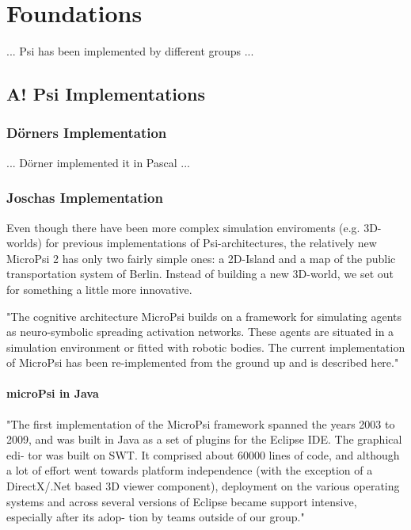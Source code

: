 \chapter{Foundations}

... Psi has been implemented by different groups ...

    \section{A! Psi Implementations}

        \subsection{Dörners Implementation}

... Dörner implemented it in Pascal ...

    \subsection{Joschas Implementation}
    
Even though there have been more complex simulation enviroments (e.g. 3D-worlds) for previous implementations of Psi-architectures, the relatively new MicroPsi 2 has only two fairly simple ones: a 2D-Island and a map of the public transportation system of Berlin. Instead of building a new 3D-world, we set out for something a little more innovative.

"The cognitive architecture MicroPsi builds on a framework for simulating agents as neuro-symbolic spreading activation networks. These agents are situated in a simulation environment or fitted with robotic bodies. The current implementation of MicroPsi has been re-implemented from the ground up and is described here."~\cite{conf/agi/Bach12}

        \subsubsection{microPsi in Java}

"The first implementation of the MicroPsi framework spanned the years 2003 to 2009, and was built in Java as a set of plugins for the Eclipse IDE. The graphical edi- tor was built on SWT. It comprised about 60000 lines of code, and although a lot of effort went towards platform independence (with the exception of a DirectX/.Net based 3D viewer component), deployment on the various operating systems and across several versions of Eclipse became support intensive, especially after its adop- tion by teams outside of our group."~\cite{conf/agi/Bach12}

